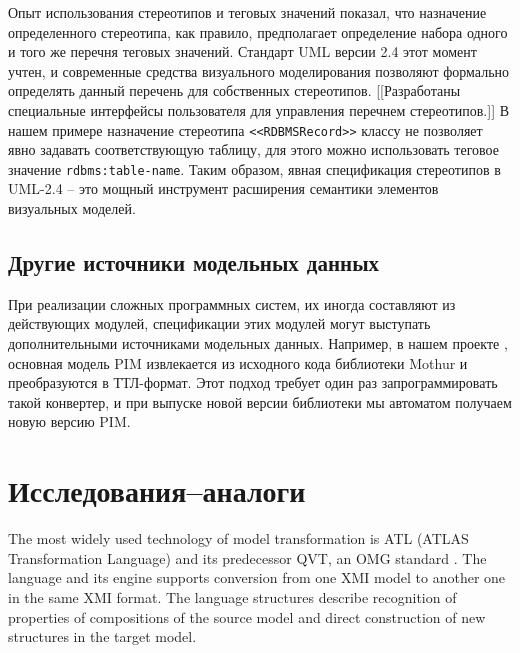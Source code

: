 \documentclass[conference]{IEEEtran} \IEEEoverridecommandlockouts
\begin{document}
Опыт использования стереотипов и теговых значений показал, что назначение определенного стереотипа, как правило, предполагает определение набора одного и того же перечня теговых значений. Стандарт UML версии 2.4 этот момент учтен, и современные средства визуального моделирования позволяют формально определять данный перечень для собственных стереотипов. [[Разработаны специальные интерфейсы пользователя для управления перечнем стереотипов.]] В нашем примере назначение стереотипа \texttt{<<RDBMSRecord>>} классу не позволяет явно задавать соответствующую таблицу, для этого можно использовать теговое значение \texttt{rdbms:table-name}. Таким образом, явная спецификация стереотипов в UML-2.4 -- это мощный инструмент расширения семантики элементов визуальных моделей. 

\subsection{Другие источники модельных данных} \label{sec:other-models} 

При реализации сложных программных систем, их иногда составляют из действующих модулей, спецификации этих модулей могут выступать дополнительными источниками модельных данных. Например, в нашем проекте \cite{bit2019}, основная модель PIM извлекается из исходного кода библиотеки Mothur и преобразуются в ТТЛ-формат. Этот подход требует один раз запрограммировать такой конвертер, и при выпуске новой версии библиотеки мы автоматом получаем новую версию PIM. 

\section{Исследования--аналоги} 

The most widely used technology of model transformation is ATL (ATLAS Transformation Language) \cite{atl} and its predecessor QVT, an OMG standard \cite{QVT}. The language and its engine supports conversion from one XMI model to another one in the same XMI format. The language structures describe recognition of properties of compositions of the source model and direct construction of new structures in the target model. 
\end{document}
